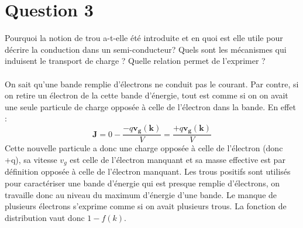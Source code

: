 \section{Question 3}
Pourquoi la notion de trou a-t-elle été introduite et en quoi est elle utile pour décrire la
conduction dans un semi-conducteur? Quels sont les mécanismes qui induisent le transport
de charge ? Quelle relation permet de l'exprimer ?
\\
\hbox{}
\\
On sait qu'une bande remplie d'électrons ne conduit pas le courant. Par contre, si on retire un électron de la cette bande d'énergie, tout est comme si on on avait une seule particule de charge opposée à celle de l'électron dans la bande. En effet :
\begin{equation}
\mathbf{J}=0-\frac{-q\mathbf{v_g}(\mathbf{k})}{V}=\frac{+q\mathbf{v_g}(\mathbf{k})}{V}
\end{equation}
Cette nouvelle particule a donc une charge opposée à celle de l'électron (donc +q), sa vitesse $v_g$ est celle de l'électron manquant et sa masse effective est par définition opposée à celle de l'électron manquant. Les trous positifs sont utilisés pour caractériser une bande d'énergie qui est presque remplie d'électrons, on travaille donc au niveau du maximum d'énergie d'une bande. Le manque de plusieurs électrons s'exprime comme si on avait plusieurs trous. La fonction de distribution vaut donc $1-f(k)$.

